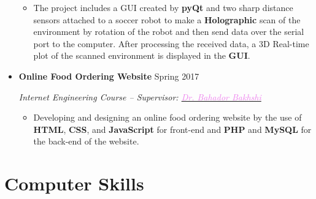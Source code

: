 \documentclass[11pt,a4paper,roman]{moderncv} %
\begin{document}
\begin{itemize}
	\begin{itemize}
		\item The project includes a GUI created by \textbf{pyQt} and two sharp distance sensors attached to a soccer robot to make a \textbf{Holographic} scan of the environment by rotation of the robot and then send data over the serial port to the computer. After processing the received data, a 3D Real-time plot of the scanned environment is displayed in the \textbf{GUI}.
	\end{itemize}
	
	\vspace{10pt}
	
	\item \textbf{Online Food Ordering Website} \hfill Spring 2017
	
	\emph{Internet Engineering Course -- Supervisor: \href{https://ceit.aut.ac.ir/~bakhshis}{\textcolor{violet}{Dr. Bahador Bakhshi}}}
	
	\begin{itemize}
		\item Developing and designing an online food ordering website by the use of \textbf{HTML}, \textbf{CSS}, and \textbf{JavaScript} for front-end and \textbf{PHP} and \textbf{MySQL} for the back-end of the website.
	\end{itemize}
	
	
\end{itemize}

\section{Computer Skills}
\end{document}

